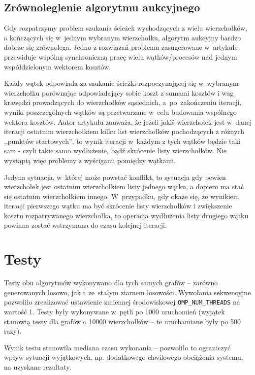 \documentclass {article}
\begin{document}
\subsection{Zrównoleglenie algorytmu aukcyjnego}

Gdy rozpatrzymy problem szukania ścieżek wychodzących z wielu wierzchołków, a kończących się w~jednym wybranym wierzchołku, algorytm aukcyjny bardzo dobrze się zrównolega. Jedno z rozwiązań problemu zasugerowane w~artykule \cite{Bertsekas1991} przewiduje wspólną synchroniczną pracę wielu wątków/procesów nad jednym współdzielonym wektorem kosztów.

Każdy wątek odpowiada za szukanie ścieżki rozpoczynającej się w~wybranym wierzchołku porównując odpowiadający sobie koszt z sumami kosztów i wag krawędzi prowadzących do wierzchołków sąsiednich, a~po~zakończeniu iteracji, wyniki poszczególnych wątków są przetwarzane w~celu budowania wspólnego wektora kosztów. Autor artykułu zauważa, że jeżeli jakiś wierzchołek jest w~danej iteracji ostatnim wierzchołkiem kilku list wierzchołków pochodzących z różnych ,,punktów startowych'', to wynik iteracji w~każdym z tych wątków będzie taki sam - czyli takie samo wydłużenie, bądź skrócenie listy wierzchołków. Nie wystąpią więc problemy z wyścigami pomiędzy wątkami.

Jedyna sytuacja, w~której może powstać konflikt, to sytuacja gdy pewien wierzchołek jest ostatnim wierzchołkiem listy jednego wątku, a dopiero ma stać się ostatnim wierzchołkiem innego. W~przypadku, gdy okaże się, że wynikiem iteracji pierwszego wątku ma być skrócenie listy wierzchołków i zwiększenie kosztu rozpatrywanego wierzchołka, to operacja wydłużenia listy drugiego wątku powinna zostać wstrzymana do czasu kolejnej iteracji.

\section{Testy}

Testy obu algorytmów wykonywano dla tych samych grafów -- zarówno generowanych losowo, jak i~ze~stałym ziarnem losowości. Wywołania sekwencyjne pozwoliło zrealizować ustawienie zmiennej środowiskowej \verb|OMP_NUM_THREADS| na wartość 1. Testy były wykonywane w~pętli po 1000 uruchomień (wyjątek stanowią testy dla grafów o 10000 wierzchołków -- te uruchamiane były po 500 razy).

Wynik testu stanowiła mediana czasu wykonania -- pozwoliło to ograniczyć wpływ sytuacji wyjątkowych, np. dodatkowego chwilowego obciążenia systemu, na uzyskane rezultaty.
\end{document}
